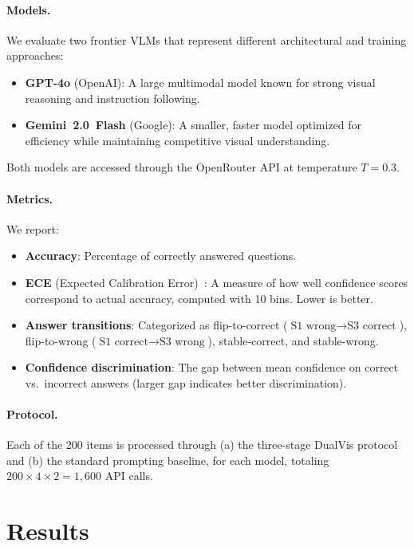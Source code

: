 \documentclass{cvpr}
\newcommand{\method}{DualVis}
\begin{document}
\paragraph{Models.}
We evaluate two frontier VLMs that represent different architectural and training approaches:
\begin{itemize}
    \item \textbf{GPT-4o} (OpenAI): A large multimodal model known for strong visual reasoning and instruction following.
    \item \textbf{Gemini~2.0~Flash} (Google): A smaller, faster model optimized for efficiency while maintaining competitive visual understanding.
\end{itemize}
Both models are accessed through the OpenRouter API at temperature $T{=}0.3$.

\paragraph{Metrics.}
We report:
\begin{itemize}
    \item \textbf{Accuracy}: Percentage of correctly answered questions.
    \item \textbf{ECE} (Expected Calibration Error)~\cite{guo2017calibration,naeini2015obtaining}: A measure of how well confidence scores correspond to actual accuracy, computed with 10 bins. Lower is better.
    \item \textbf{Answer transitions}: Categorized as flip-to-correct ($\text{S1 wrong} \rightarrow \text{S3 correct}$), flip-to-wrong ($\text{S1 correct} \rightarrow \text{S3 wrong}$), stable-correct, and stable-wrong.
    \item \textbf{Confidence discrimination}: The gap between mean confidence on correct vs.\ incorrect answers (larger gap indicates better discrimination).
\end{itemize}

\paragraph{Protocol.}
Each of the 200 items is processed through (a) the three-stage \method{} protocol and (b) the standard prompting baseline, for each model, totaling $200 \times 4 \times 2 = 1{,}600$ API calls.

\section{Results}
\end{document}
